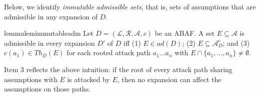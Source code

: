 \documentclass[letterpaper]{article} %
\newcommand{\adm}{\textit{ad}}
\newcommand{\com}{\textit{co}}
\newcommand{\prf}{\textit{pr}}
\newcommand{\theory}{\mathit{Th}}
\newcommand{\asm}{\ensuremath{\mathcal{A}}}
\newcommand{\atoms}{\mathcal{L}}
\newcommand{\ruleset}{\mathcal{R}}
\newcommand{\assumptions}{\mathcal{A}}
\newcommand{\contra}{c}
\newcommand{\contrary}[1]{c(#1)}
\newcommand{\ABAdef}{D=(\atoms,\ruleset,\assumptions,\contra)}
\newcommand{\contraryArgs}[1]{\asm^{c}_{#1}}
\begin{document}
Below, we identify \emph{immutable admissible sets}, that is, sets of assumptions that are admissible in any expansion of $D$. 
%
\newcommand{\admi}{\adm_i}
\newcommand{\prfi}{\prf_i}
\newcommand{\comi}{\com_i}
\begin{restatable}{lemma}{lemimmutableadm}\label{lem:immutable adm extensions}
    Let $\ABAdef$ be an ABAF. 
    A set $E\subseteq \asm$ is admissible in every expansion $D'$ of $D$ iff
    (1) $E\in \adm(D)$; (2) $E\subseteq \contraryArgs{D}$; and (3) $\contrary{a_1}\in \theory_D(E)$ for each rooted attack path $a_1\ldots a_n$ with $E\cap \{a_1,\ldots,a_n\}\neq \emptyset$.
\end{restatable}
%
Item 3 reflects the above intuition: if the root of every attack path sharing assumptions with $E$ is attacked by $E$, then no expansion can affect the assumptions on those paths. 
\end{document}
